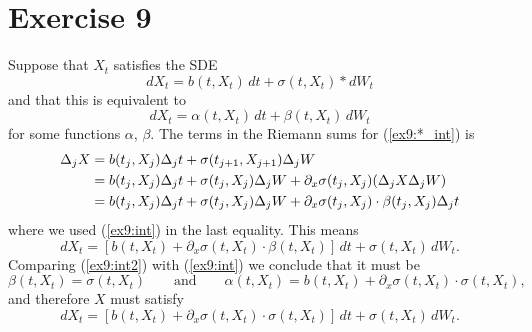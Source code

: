\documentclass[a4paper,11pt]{article}
\theoremstyle{definition}
\theoremstyle{plain}
\theoremstyle{remark}
\begin{document}
\section*{Exercise 9}

Suppose that $X_t$ satisfies the SDE 
\begin{equation}
dX_t = b(t,X_t)\,dt + \sigma(t,X_t)*dW_t
\label{ex9:*_int}
\end{equation}
and that this is equivalent to
\begin{equation} 
\label{ex9:int}
dX_t = \alpha(t,X_t)\,dt + \beta(t,X_t)\,dW_t
\end{equation}
for some functions $\alpha$, $\beta$. The terms in the Riemann sums
for (\ref{ex9:*_int}) is
\begin{align}
\Delta_j X & = b(t_j,X_j)\Delta_j t + \sigma(t_{j+1},X_{j+1})\Delta_j W \notag\\ & = b(t_j,X_j)\Delta_j t + \sigma(t_j,X_j)\Delta_jW+\partial_x\sigma(t_j,X_j)(\Delta_jX\Delta_jW) \notag\\ & = b(t_j,X_j)\Delta_j t + \sigma(t_j,X_j)\Delta_jW+\partial_x\sigma(t_j,X_j)
\cdot\beta(t_j,X_j)\Delta_jt \notag
\end{align}
where we used (\ref{ex9:int}) in the last equality. This means
\begin{equation}
dX_t = [b(t,X_t)+\partial_x\sigma(t,X_t)
\cdot\beta(t,X_t)]\,dt + \sigma(t,X_t)\,dW_t.
\label{ex9:int2}
\end{equation}
Comparing (\ref{ex9:int2}) with (\ref{ex9:int}) we conclude that it must be
$$
\beta(t,X_t) = \sigma(t,X_t) \qquad\text{and}\qquad \alpha(t,X_t) = b(t,X_t)+\partial_x\sigma(t,X_t)\cdot \sigma(t,X_t),
$$
and therefore $X$ must satisfy
$$
dX_t = [b(t,X_t)+\partial_x\sigma(t,X_t)\cdot \sigma(t,X_t)]\,dt + \sigma(t,X_t)\,dW_t.
$$
\end{document}
